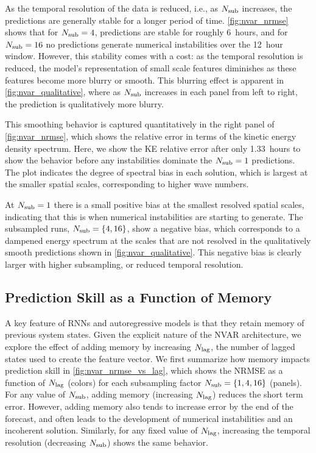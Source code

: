 As the temporal resolution of the data is reduced, i.e., as $N_\text{sub}$ increases,
the predictions are generally stable for a longer period of time.
\cref{fig:nvar_nrmse} shows that for $N_\text{sub}=4$, predictions are stable for roughly
6~hours, and for $N_\text{sub}=16$ no predictions generate numerical instabilities over the
12~hour window.
However, this stability comes with a cost: as the temporal resolution is
reduced, the model's representation of small scale features diminishes as these
features become more blurry or smooth.
This blurring effect is apparent in \cref{fig:nvar_qualitative}, where as
$N_\text{sub}$ increases in each panel from left to right, the prediction is
qualitatively more blurry.

This smoothing behavior is captured quantitatively in the right panel of
\cref{fig:nvar_nrmse},
which shows the relative error in terms of the kinetic energy density spectrum.
Here, we show the KE relative error after only 1.33~hours to show the behavior
before any instabilities dominate the $N_\text{sub}=1$ predictions.
The plot indicates the degree of spectral bias in each solution, which is
largest at the smaller spatial scales, corresponding to higher wave numbers.

At $N_\text{sub}=1$ there is a small positive bias at the smallest resolved spatial
scales, indicating that this is when numerical instabilities are starting to
generate.
The subsampled runs, $N_\text{sub}=\{4,16\}$, show a negative bias, which corresponds
to a dampened energy spectrum at the scales that are not resolved in the
qualitatively smooth predictions shown in \cref{fig:nvar_qualitative}.
This negative bias is clearly larger with higher subsampling, or reduced
temporal resolution.


\subsection{Prediction Skill as a Function of Memory}
\label{subsec:nvar-memory}

A key feature of RNNs and autoregressive models is that they retain memory of
previous system states.
Given the explicit nature of the NVAR architecture, we explore the effect of
adding memory by increasing $N_\text{lag}$, the number of lagged states used to create the
feature vector.
We first summarize how memory impacts prediction skill in
\cref{fig:nvar_nrmse_vs_lag}, which shows the NRMSE as a
function of $N_\text{lag}$ (colors) for each
subsampling factor $N_\text{sub} = \{1, 4, 16\}$ (panels).
For any value of $N_\text{sub}$, adding memory (increasing $N_\text{lag}$) reduces
the short term error.
However, adding memory also tends to increase error by the end of the forecast,
and often leads to the development of numerical instabilities and an
incoherent solution.
Similarly, for any fixed value of $N_\text{lag}$, increasing the temporal resolution
(decreasing $N_\text{sub}$) shows the same behavior.

